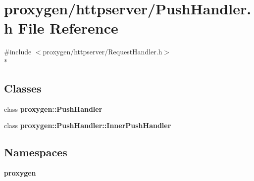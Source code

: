\section{proxygen/httpserver/\+Push\+Handler.h File Reference}
\label{PushHandler_8h}
{\ttfamily \#include $<$proxygen/httpserver/\+Request\+Handler.\+h$>$}\\*
\subsection*{Classes}
\begin{DoxyCompactItemize}
\item 
class {\bf proxygen\+::\+Push\+Handler}
\item 
class {\bf proxygen\+::\+Push\+Handler\+::\+Inner\+Push\+Handler}
\end{DoxyCompactItemize}
\subsection*{Namespaces}
\begin{DoxyCompactItemize}
\item 
 {\bf proxygen}
\end{DoxyCompactItemize}

